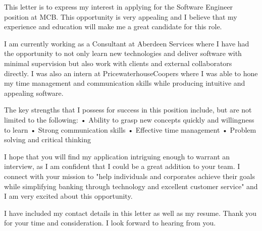 \documentclass[11pt, a4paper]{awesome-cv}
\begin{document}
\makecvheader[R]


\makelettertitle

\begin{cvparagraph}

\newline \newline 
This letter is to express my interest in applying for the Software Engineer position at MCB. This opportunity is very appealing and I believe that my experience and education will make me a great candidate for this role.\newline

I am currently working as a Consultant at Aberdeen Services where I have had the opportunity to not only learn new technologies and deliver software with minimal supervision but also work with clients and external collaborators directly. I was also an intern at PricewaterhouseCoopers where I was able to hone my time management and communication skills while producing intuitive and appealing software.\newline

The key strengths that I possess for success in this position include, but are not limited to the following:\newline
• Ability to grasp new concepts quickly and willingness to learn\newline
• Strong communication skills\newline
• Effective time management\newline
• Problem solving and critical thinking\newline

I hope that you will find my application intriguing enough to warrant an interview, as I am confident that I could be a great addition to your team. I connect with your mission to "help individuals and corporates achieve their goals while simplifying banking through technology and excellent customer service" and I am very excited about this opportunity.\newline

I have included my contact details in this letter as well as my resume. Thank you for your time and consideration. I look forward to hearing from you.
\end{cvparagraph}



\makeletterclosing
\end{document}
